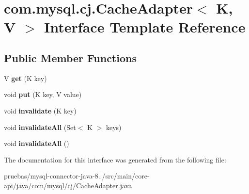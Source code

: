 \hypertarget{interfacecom_1_1mysql_1_1cj_1_1_cache_adapter}{}\section{com.\+mysql.\+cj.\+Cache\+Adapter$<$ K, V $>$ Interface Template Reference}
\label{interfacecom_1_1mysql_1_1cj_1_1_cache_adapter}
\subsection*{Public Member Functions}
\begin{DoxyCompactItemize}
\item 
\mbox{\label{interfacecom_1_1mysql_1_1cj_1_1_cache_adapter_a4febd3fc8295c102d7162898531b9c05}} 
V {\bfseries get} (K key)
\item 
\mbox{\label{interfacecom_1_1mysql_1_1cj_1_1_cache_adapter_a4f9009be8c604a82869b84dc545d06f8}} 
void {\bfseries put} (K key, V value)
\item 
\mbox{\label{interfacecom_1_1mysql_1_1cj_1_1_cache_adapter_a6b1f13c49438687c5151165ee9e6533d}} 
void {\bfseries invalidate} (K key)
\item 
\mbox{\label{interfacecom_1_1mysql_1_1cj_1_1_cache_adapter_a14cacba0c17fb6fb9883c65bcbe81c44}} 
void {\bfseries invalidate\+All} (Set$<$ K $>$ keys)
\item 
\mbox{\label{interfacecom_1_1mysql_1_1cj_1_1_cache_adapter_afccea08d532646e291f13af43ca85db0}} 
void {\bfseries invalidate\+All} ()
\end{DoxyCompactItemize}


The documentation for this interface was generated from the following file\+:\begin{DoxyCompactItemize}
\item 
pruebas/mysql-\/connector-\/java-\/8../src/main/core-\/api/java/com/mysql/cj/Cache\+Adapter.\+java\end{DoxyCompactItemize}
